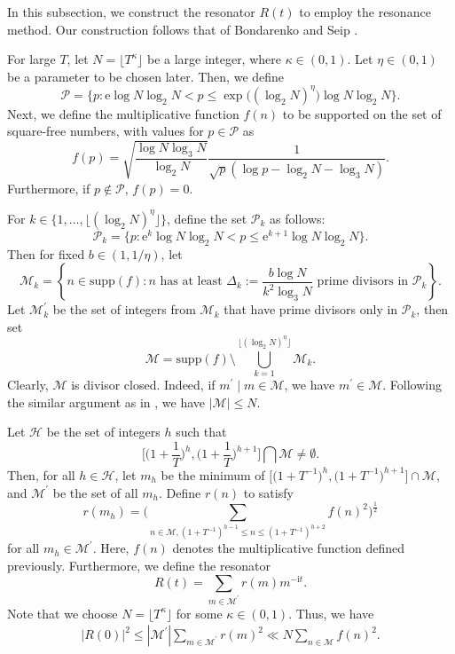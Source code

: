 \documentclass[12pt,reqno]{amsart}
\theoremstyle{definition}
\numberwithin{equation}{section}
\newcommand{\bg}{\big}
\newcommand{\bgg}{\bigg}
\newcommand{\Bgl}{\Big(}
\newcommand{\Bgr}{\Big)}
\newcommand{\lo}{\log_2}
\newcommand{\lt}{\log_3}
\newcommand{\inv}{^{-1}}
\newcommand{\mch}{\mathcal{H}}
\newcommand{\mcp}{\mathcal{P}}
\newcommand{\mcm}{\mathcal{M}}
\newcommand{\mme}{\mathrm{e}}
\newcommand{\mit}{\mathrm{i}t}
\begin{document}
In this subsection, we construct the resonator \(R(t)\) to employ the resonance method. Our construction follows that of Bondarenko and Seip \cite{bondarenko2018argument}.
\par
For large \(T\), let \(N = \lfloor T^\kappa \rfloor\) be a large integer, where \(\kappa \in (0,1)\). Let \(\eta \in (0,1)\) be a parameter to be chosen later. Then, we define 
\[
\mcp = \bg\{p : \mme \log N \log_{2}N < p \leq \exp\bg((\log_2 N)^{\eta}\bg) \log N \log_{2}N \bg\}.
\]
Next, we define the multiplicative function \(f(n)\) to be supported on the set of square-free numbers, with values for \(p \in \mcp\) as
\[
f(p)=\sqrt{\frac{\log N \lt N}{\lo N}} \frac{1}{\sqrt{p}(\log p - \lo N-\lt N)}.
\]
Furthermore, if \(p \notin \mcp\), \(f(p)=0\).
\par
For \(k \in \bg\{1,\dots, \lfloor (\log_2 N)^{\eta} \rfloor\bg\}\), define the set \(\mcp_k\) as follows:
\[
\mathcal{P}_{k} = \bg\{p : \mme^k \log N \log_{2}N < p \leq \mme^{k+1} \log N\log_{2}N \bg\}.
\]
Then for fixed \(b \in (1,1/\eta)\), let
\[
\mathcal{M}_{k} = \left\{ n \in \mathrm{supp}(f) : n \text{ has at least } \Delta_k := \frac{b \log N }{k^2 \log_3 N} \text{ prime divisors in } \mathcal{P}_{k} \right\}.
\]
Let \(\mathcal{M}^{\prime}_{k}\) be the set of integers from \(\mathcal{M}_{k}\) that have prime divisors only in \(\mathcal{P}_{k}\), then set
\[
\mathcal{M} = \mathrm{supp}(f) \setminus \bigcup_{k = 1}^{\lfloor(\log_2 N)^{\eta}\rfloor} \mathcal{M}_{k}.
\]
Clearly, \(\mathcal{M}\) is divisor closed. Indeed, if \(m^{\prime} \mid m \in \mathcal{M}\), we have \(m^{\prime} \in \mathcal{M}\). Following the similar argument as in \cite[Lemma 2]{bondarenko2017large}, we have \(|\mcm| \le N\).
\par
Let \(\mch\) be the set of integers \(h\) such that 
\[
\bgg[\Bgl1+\frac{1}{T} \Bgr^h, \Bgl1+\frac{1}{T} \Bgr^{h+1} \bgg] \bigcap \mcm \neq \emptyset.
\]
Then, for all \(h \in \mch\), let \(m_h\) be the minimum of \(\bg[\bg(1+T\inv\bg)^h, \bg(1+T\inv\bg)^{h+1}\bg] \cap \mcm\), and \(\mcm^\prime\) be the set of all \(m_h\). Define \(r(n)\) to satisfy
\[
r(m_h) = \Bigg( \sum_{n \in \mathcal{M},  (1 +T\inv)^{h - 1} \le n \le (1 + T\inv)^{h + 2}} f(n)^2 \Bigg)^{\frac{1}{2}}
\]
for all \(m_h \in \mcm^\prime\). Here, \(f(n)\) denotes the multiplicative function defined previously. Furthermore, we define the resonator
\[
R(t) = \sum_{m \in \mcm^{\prime}}r(m)m^{-\mit}.
\]
Note that we choose \(N = \lfloor T^\kappa \rfloor\) for some \(\kappa \in (0,1)\). Thus, we have
\begin{align}
\label{R0-upper}
    |R(0)|^2 \le |\mcm^\prime|\sum_{m \in \mcm^\prime} r(m)^2 \ll N \sum_{n \in \mcm}f(n)^2.
\end{align}
\end{document}
